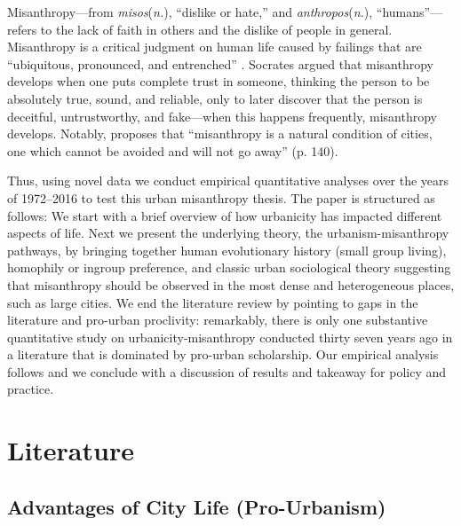 \documentclass[11pt, letterpaper]{article}
\begin{document}
\begin{spacing}{1.4}
Misanthropy---from \textit{misos}(\textit{n.}), ``dislike or hate,'' and \textit{anthropos}(\textit{n.}), ``humans''---refers to the lack of faith in others and the dislike of people in general.   
%
Misanthropy is a critical judgment on human life caused by failings that are ``ubiquitous, pronounced, and entrenched'' \citep[p. 7]{cooper2018animals}.
Socrates \citep[cited in][]{melgar13} argued
that misanthropy develops when one puts complete trust in someone, thinking the
person to be absolutely true, sound, and reliable, only to later discover that
the person is deceitful, untrustworthy, and fake---when this happens frequently,
misanthropy develops.
 Notably, \citet[]{thrift05} proposes that ``misanthropy is a natural
condition of cities, one which cannot be avoided and will not go away''
(p. 140). %
 
Thus, using novel data we conduct empirical quantitative analyses over the years of 1972--2016 to test this urban misanthropy thesis. The paper is structured as follows: We start with a brief overview of how urbanicity has impacted different aspects of life. Next we present the underlying theory, the urbanism-misanthropy pathways, by bringing together human evolutionary history (small group living), homophily or ingroup preference, and classic urban sociological theory suggesting that
misanthropy should be observed in the most dense and heterogeneous places, such as large cities. We end the literature review by pointing to gaps in the literature and pro-urban proclivity: remarkably, there is only one substantive quantitative study on urbanicity-misanthropy conducted thirty seven years ago in a literature that is dominated by pro-urban scholarship. %
 Our
empirical analysis follows and we conclude with a discussion of results and %
 takeaway for policy and practice.
   

\section*{Literature}

\subsection*{Advantages of City Life (Pro-Urbanism)}    
    

\end{spacing}
\end{document}
